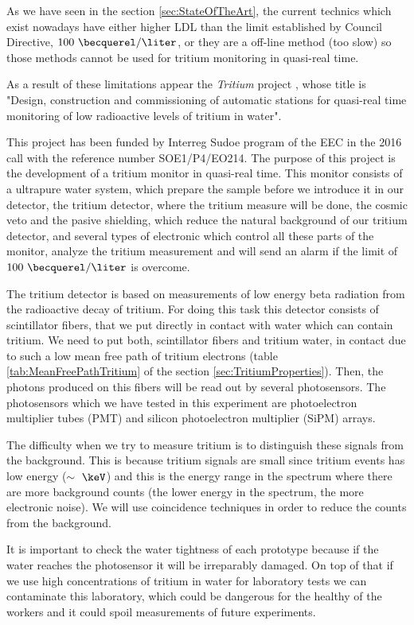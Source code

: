 As we have seen in the section \ref{sec:StateOfTheArt}, the current technics which exist nowadays have either higher LDL than the limit established by Council Directive, $100~\becquerel/\liter$, or they are a off-line method (too slow) so those methods cannot be used for tritium monitoring in quasi-real time. 

As a result of these limitations appear the \textit{Tritium} project \cite{TRITIUM}, whose title is "Design, construction and commissioning of automatic stations for quasi-real time monitoring of low radioactive levels of tritium in water".

This project has been funded by Interreg Sudoe program of the EEC in the 2016 call with the reference number SOE1/P4/EO214. The purpose of this project is the development of a tritium monitor in quasi-real time. This monitor consists of a ultrapure water system, which prepare the sample before we introduce it in our detector, the tritium detector, where the tritium measure will be done, the cosmic veto and the pasive shielding, which reduce the natural background of our tritium detector, and several types of electronic which control all these parts of the monitor, analyze the tritium measurement and will send an alarm if the limit of $100~\becquerel/\liter$ is overcome.

The tritium detector is based on measurements of low energy beta radiation from the radioactive decay of tritium. For doing this task this detector consists of scintillator fibers, that we put directly in contact with water which can contain tritium. We need to put both, scintillator fibers and tritium water, in contact due to such a low mean free path of tritium electrons (table \ref{tab:MeanFreePathTritium} of the section \ref{sec:TritiumProperties}). Then, the photons produced on this fibers will be read out by several photosensors. The photosensors which we have tested in this experiment are photoelectron multiplier tubes (PMT) and silicon photoelectron multiplier (SiPM) arrays. 

The difficulty when we try to measure tritium is to distinguish these signals from the background. This is because tritium signals are small since tritium events has low energy ($\sim~\keV$) and this is the energy range in the spectrum where there are more background counts (the lower energy in the spectrum, the more electronic noise). We will use coincidence techniques in order to reduce the counts from the background.

It is important to check the water tightness of each prototype because if the water reaches the photosensor it will be irreparably damaged. On top of that if we use high concentrations of tritium in water for laboratory tests we can contaminate this laboratory, which could be dangerous for the healthy of the workers and it could spoil measurements of future experiments.


